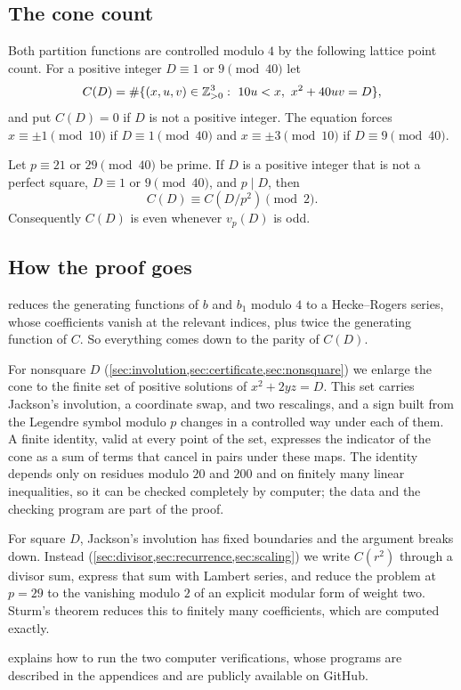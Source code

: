 \subsection*{The cone count}
Both partition functions are controlled modulo $4$ by the following lattice
point count. For a positive integer $D\equiv1$ or $9\pmod{40}$ let
\[
  C(D)=\#\{(x,u,v)\in\Z_{>0}^3:\ 10u<x,\ x^2+40uv=D\},
\]
and put $C(D)=0$ if $D$ is not a positive integer. The equation forces
$x\equiv\pm1\pmod{10}$ if $D\equiv1\pmod{40}$ and $x\equiv\pm3\pmod{10}$ if
$D\equiv9\pmod{40}$.

\begin{theorem}\label{thm:cone-parity}
Let $p\equiv21$ or $29\pmod{40}$ be prime. If $D$ is a positive integer that is
not a perfect square, $D\equiv1$ or $9\pmod{40}$, and $p\mid D$, then
\begin{equation}\label{eq:cone-parity}
  C(D)\equiv C(D/p^2)\pmod2 .
\end{equation}
Consequently $C(D)$ is even whenever $v_p(D)$ is odd.
\end{theorem}

\subsection*{How the proof goes}
 reduces the generating functions of $b$ and $b_1$ modulo $4$
to a Hecke--Rogers series, whose coefficients vanish at the relevant indices,
plus twice the generating function of $C$. So everything comes down to the
parity of $C(D)$.

For nonsquare $D$ (\cref{sec:involution,sec:certificate,sec:nonsquare}) we
enlarge the cone to the finite set of positive solutions of $x^2+2yz=D$. This
set carries Jackson's involution, a coordinate swap, and two rescalings, and a
sign built from the Legendre symbol modulo $p$ changes in a controlled way
under each of them. A finite identity, valid at every point of the set,
expresses the indicator of the cone as a sum of terms that cancel in pairs
under these maps. The identity depends only on residues modulo $20$ and $200$
and on finitely many linear inequalities, so it can be checked completely by
computer; the data and the checking program are part of the proof.

For square $D$, Jackson's involution has fixed boundaries and the argument
breaks down. Instead (\cref{sec:divisor,sec:recurrence,sec:scaling}) we write
$C(r^2)$ through a divisor sum, express that sum with Lambert series, and reduce
the problem at $p=29$ to the vanishing modulo $2$ of an explicit modular form of
weight two. Sturm's theorem reduces this to finitely many coefficients, which
are computed exactly.

 explains how to run the two computer verifications,
whose programs are described in the appendices and are publicly available on GitHub.
